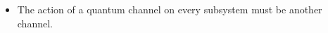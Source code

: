\documentclass[11pt,dvipsnames]{article}
\begin{document}
\begin{itemize}
		

%

	\item The action of a quantum channel on every subsystem must be another
				channel.

\end{itemize}
\end{document}
